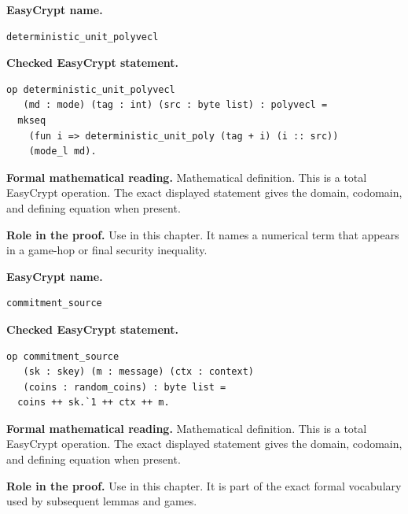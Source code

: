 \begin{formaldefinition}
\noindent\textbf{EasyCrypt name.}
\begin{lstlisting}[language=EasyCrypt,basicstyle=\ttfamily\scriptsize]
deterministic_unit_polyvecl
\end{lstlisting}
\noindent\textbf{Checked EasyCrypt statement.}
\begin{lstlisting}[language=EasyCrypt,basicstyle=\ttfamily\scriptsize]
op deterministic_unit_polyvecl
   (md : mode) (tag : int) (src : byte list) : polyvecl =
  mkseq
    (fun i => deterministic_unit_poly (tag + i) (i :: src))
    (mode_l md).
\end{lstlisting}
\noindent\textbf{Formal mathematical reading.}
Mathematical definition. This is a total EasyCrypt operation.  The exact displayed statement gives the domain, codomain, and defining equation when present.

\noindent\textbf{Role in the proof.}
Use in this chapter. It names a numerical term that appears in a game-hop or final security inequality.

\end{formaldefinition}

\begin{formaldefinition}
\noindent\textbf{EasyCrypt name.}
\begin{lstlisting}[language=EasyCrypt,basicstyle=\ttfamily\scriptsize]
commitment_source
\end{lstlisting}
\noindent\textbf{Checked EasyCrypt statement.}
\begin{lstlisting}[language=EasyCrypt,basicstyle=\ttfamily\scriptsize]
op commitment_source
   (sk : skey) (m : message) (ctx : context)
   (coins : random_coins) : byte list =
  coins ++ sk.`1 ++ ctx ++ m.
\end{lstlisting}
\noindent\textbf{Formal mathematical reading.}
Mathematical definition. This is a total EasyCrypt operation.  The exact displayed statement gives the domain, codomain, and defining equation when present.

\noindent\textbf{Role in the proof.}
Use in this chapter. It is part of the exact formal vocabulary used by subsequent lemmas and games.

\end{formaldefinition}

